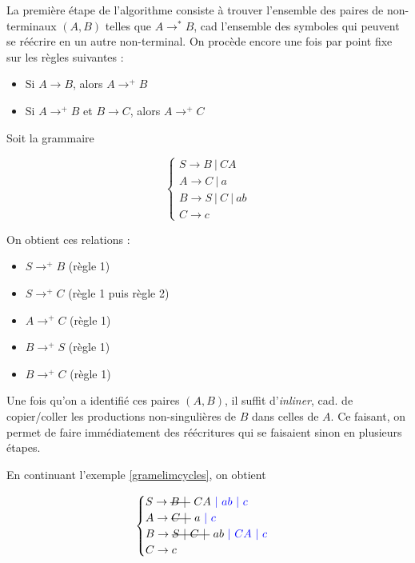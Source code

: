 La première étape de l'algorithme consiste à trouver l'ensemble des paires de non-terminaux $(A,B)$ telles que $A \rightarrow^* B$, cad l'ensemble des symboles qui peuvent se réécrire en un autre non-terminal. On procède encore une fois par point fixe sur les règles suivantes : 

\begin{itemize}
\item Si $A \rightarrow B$, alors $A \rightarrow^+ B$
\item Si $A \rightarrow^+ B$ et $B \rightarrow C$, alors $A \rightarrow^+ C$
\end{itemize}

\begin{example}
\label{gramelimcycles}
Soit la grammaire 

\[
\begin{cases}
S \rightarrow B~|~CA \\
A \rightarrow C~|~a \\
B \rightarrow S~|~C~|~ab \\
C \rightarrow c 
\end{cases}
\]

On obtient ces relations :

\begin{itemize}
\item $S \rightarrow^+ B$ (règle 1)
\item $S \rightarrow^+ C$ (règle 1 puis règle 2)
\item $A \rightarrow^+ C$ (règle 1)
\item $B \rightarrow^+ S$ (règle 1)
\item $B \rightarrow^+ C$ (règle 1)
\end{itemize}

\end{example}

Une fois qu'on a identifié ces paires $(A,B)$, il suffit d'\textit{inliner}, cad. de copier/coller les productions non-singulières de $B$ dans celles de $A$. Ce faisant, on permet de faire immédiatement des réécritures qui se faisaient sinon en plusieurs étapes. 

\begin{example}
En continuant l'exemple \ref{gramelimcycles}, on obtient 

\[
\begin{cases}
S \rightarrow \text{\st{$B~|~$}}~CA \textcolor{blue}{~|~ab~|~c} \\
A \rightarrow \text{\st{$C~|~$}}~a \textcolor{blue}{~|~c}\\
B \rightarrow \text{\st{$S~|~C~|~$}}~ab \textcolor{blue}{~|~CA~|~c} \\
C \rightarrow c
\end{cases}
\]

\end{example}

